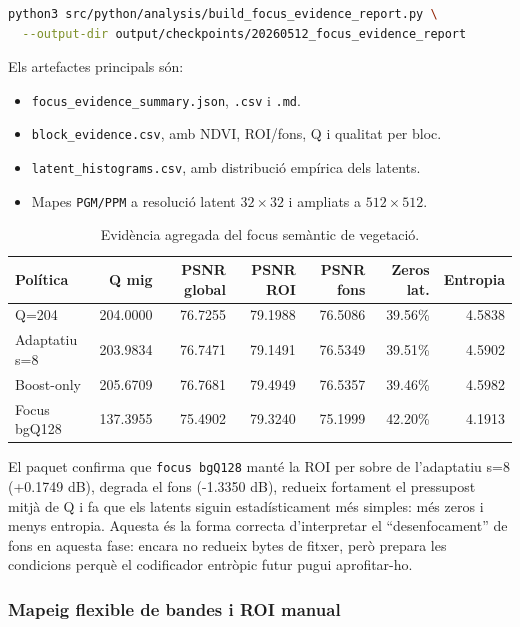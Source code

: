 \documentclass[11pt,a4paper]{article}
\begin{document}
\begin{lstlisting}[language=bash]
python3 src/python/analysis/build_focus_evidence_report.py \
  --output-dir output/checkpoints/20260512_focus_evidence_report
\end{lstlisting}

Els artefactes principals són:
\begin{itemize}
  \item \texttt{focus\_evidence\_summary.json}, \texttt{.csv} i \texttt{.md}.
  \item \texttt{block\_evidence.csv}, amb NDVI, ROI/fons, Q i qualitat per bloc.
  \item \texttt{latent\_histograms.csv}, amb distribució empírica dels latents.
  \item Mapes \texttt{PGM/PPM} a resolució latent $32 \times 32$ i ampliats a $512 \times 512$.
\end{itemize}

\begin{table}[H]
\centering
\begin{tabular}{lrrrrrr}
\toprule
\textbf{Política} & \textbf{Q mig} & \textbf{PSNR global} & \textbf{PSNR ROI} & \textbf{PSNR fons} & \textbf{Zeros lat.} & \textbf{Entropia} \\
\midrule
Q=204 & 204.0000 & 76.7255 & 79.1988 & 76.5086 & 39.56\% & 4.5838 \\
Adaptatiu s=8 & 203.9834 & 76.7471 & 79.1491 & 76.5349 & 39.51\% & 4.5902 \\
Boost-only & 205.6709 & 76.7681 & 79.4949 & 76.5357 & 39.46\% & 4.5982 \\
Focus bgQ128 & 137.3955 & 75.4902 & 79.3240 & 75.1999 & 42.20\% & 4.1913 \\
\bottomrule
\end{tabular}
\caption{Evidència agregada del focus semàntic de vegetació.}
\end{table}

El paquet confirma que \texttt{focus bgQ128} manté la ROI per sobre de l'adaptatiu s=8 (+0.1749 dB), degrada el fons (-1.3350 dB), redueix fortament el pressupost mitjà de Q i fa que els latents siguin estadísticament més simples: més zeros i menys entropia. Aquesta és la forma correcta d'interpretar el ``desenfocament'' de fons en aquesta fase: encara no redueix bytes de fitxer, però prepara les condicions perquè el codificador entròpic futur pugui aprofitar-ho.

\subsubsection{Mapeig flexible de bandes i ROI manual}
\end{document}

